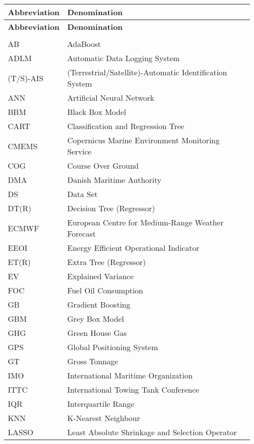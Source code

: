 \begin{longtable}[l]{>{}l<{}l}
  \textbf{Abbreviation} & \textbf{Denomination} \\[0.5ex] \hline%
  \endfirsthead%
  \textbf{Abbreviation} & \textbf{Denomination} \\[0.5ex] \hline%
  \endhead%
\renewcommand{\arraystretch}{1.4}\label{abbreviations}
&\\%
AB          & AdaBoost\\%
ADLM        & Automatic Data Logging System\\%
(T/S)-AIS   & (Terrestrial/Satellite)-Automatic Identification System\\%
ANN         & Artificial Neural Network\\%
BBM         & Black Box Model\\%
CART        & Classification and Regression Tree\\%
CMEMS       & Copernicus Marine Environment Monitoring Service \\%
COG         & Course Over Ground \\%
DMA         & Danish Maritime Authority \\%
DS          & Data Set \\%
DT(R)       & Decision Tree (Regressor)\\%
ECMWF       & European Centre for Medium-Range Weather Forecast\\%
EEOI        & Energy Efficient Operational Indicator\\%
ET(R)       & Extra Tree (Regressor)\\%
EV          & Explained Variance \\%
FOC         & Fuel Oil Consumption\\%
GB          & Gradient Boosting\\%
GBM         & Grey Box Model \\%
GHG         & Green House Gas \\%
GPS         & Global Positioning System\\%
GT          & Gross Tonnage\\%
IMO         & International Maritime Organization\\%
ITTC        & International Towing Tank Conference \\%
IQR         & Interquartile Range \\%
KNN         & K-Nearest Neighbour\\%
LASSO       & Least Absolute Shrinkage and Selection Operator\\%

\end{longtable}
